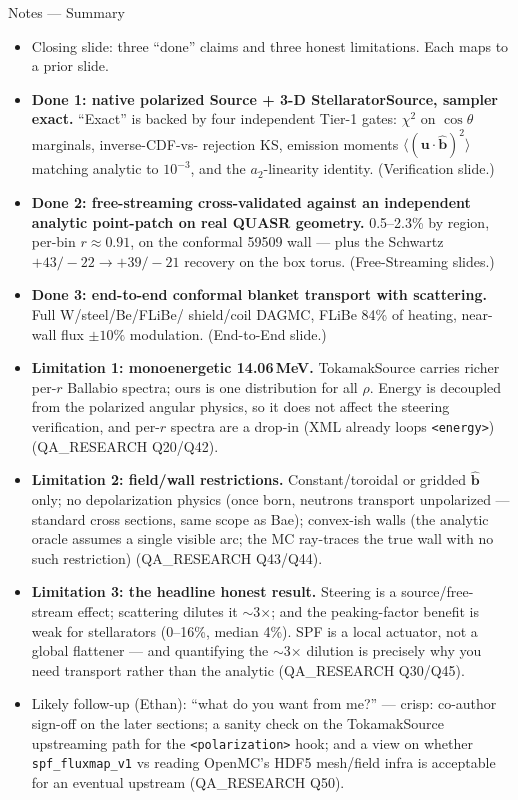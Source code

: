 \documentclass[11pt,aspectratio=169]{beamer}
\newcommand{\bhat}{\hat{\mathbf{b}}}
\begin{document}
\begin{frame}[allowframebreaks]{Notes --- Summary}
{\color{red}\footnotesize
\begin{itemize}
\item Closing slide: three ``done'' claims and three honest limitations. Each maps to a prior slide.
\item \textbf{Done 1: native polarized Source + 3-D StellaratorSource, sampler exact.} ``Exact'' is
      backed by four independent Tier-1 gates: $\chi^2$ on $\cos\theta$ marginals, inverse-CDF-vs-
      rejection KS, emission moments $\langle(\mathbf{u}\cdot\bhat)^2\rangle$ matching analytic to
      $10^{-3}$, and the $a_2$-linearity identity. (Verification slide.)
\item \textbf{Done 2: free-streaming cross-validated against an independent analytic point-patch on
      real QUASR geometry.} 0.5--2.3\% by region, per-bin $r\approx0.91$, on the conformal 59509 wall
      --- plus the Schwartz $+43/-22 \to +39/-21$ recovery on the box torus. (Free-Streaming slides.)
\item \textbf{Done 3: end-to-end conformal blanket transport with scattering.} Full W/steel/Be/FLiBe/
      shield/coil DAGMC, FLiBe 84\% of heating, near-wall flux $\pm10\%$ modulation. (End-to-End slide.)
\item \textbf{Limitation 1: monoenergetic 14.06\,MeV.} TokamakSource carries richer per-$r$ Ballabio
      spectra; ours is one distribution for all $\rho$. Energy is decoupled from the polarized angular
      physics, so it does not affect the steering verification, and per-$r$ spectra are a drop-in (XML
      already loops \texttt{<energy>}) (QA\_RESEARCH Q20/Q42).
\item \textbf{Limitation 2: field/wall restrictions.} Constant/toroidal or gridded $\bhat$ only; no
      depolarization physics (once born, neutrons transport unpolarized --- standard cross sections,
      same scope as Bae); convex-ish walls (the analytic oracle assumes a single visible arc; the MC
      ray-traces the true wall with no such restriction) (QA\_RESEARCH Q43/Q44).
\item \textbf{Limitation 3: the headline honest result.} Steering is a source/free-stream effect;
      scattering dilutes it $\sim$3$\times$; and the peaking-factor benefit is weak for stellarators
      (0--16\%, median 4\%). SPF is a local actuator, not a global flattener --- and quantifying the
      $\sim$3$\times$ dilution is precisely why you need transport rather than the analytic
      (QA\_RESEARCH Q30/Q45).
\item Likely follow-up (Ethan): ``what do you want from me?'' --- crisp: co-author sign-off on the
      later sections; a sanity check on the TokamakSource upstreaming path for the \texttt{<polarization>}
      hook; and a view on whether \texttt{spf\_fluxmap\_v1} vs reading OpenMC's HDF5 mesh/field infra is
      acceptable for an eventual upstream (QA\_RESEARCH Q50).
\end{itemize}
}
\end{frame}
\end{document}
